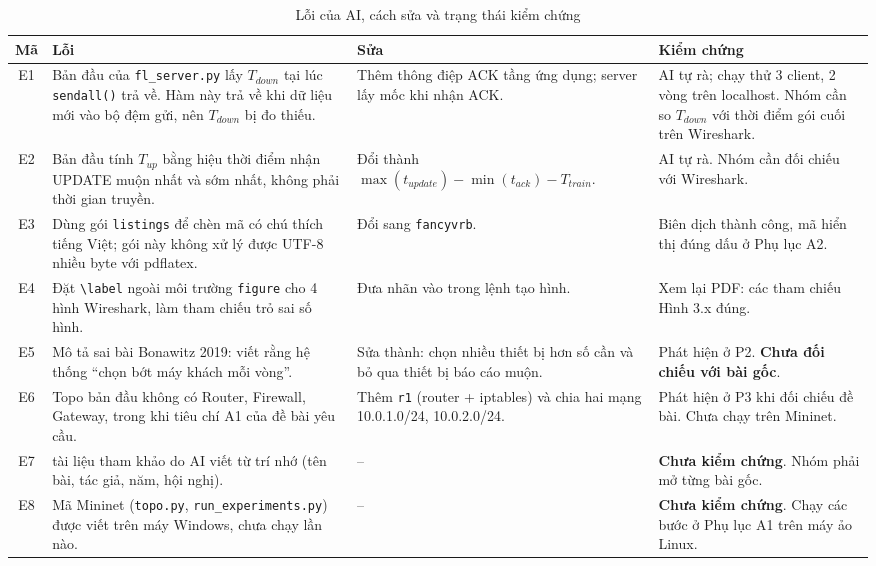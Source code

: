\begin{table}[H]
    \centering
    \caption{Lỗi của AI, cách sửa và trạng thái kiểm chứng}
    \label{tab:aierrors}
    \footnotesize
    \begin{tabularx}{\textwidth}{c >{\raggedright\arraybackslash}X >{\raggedright\arraybackslash}X >{\raggedright\arraybackslash}X}
        \toprule
        \textbf{Mã} & \textbf{Lỗi} & \textbf{Sửa} & \textbf{Kiểm chứng} \\
        \midrule
        E1 & Bản đầu của \texttt{fl\_server.py} lấy $T_{down}$ tại lúc \texttt{sendall()} trả về. Hàm này trả về khi dữ liệu mới vào bộ đệm gửi, nên $T_{down}$ bị đo thiếu. & Thêm thông điệp ACK tầng ứng dụng; server lấy mốc khi nhận ACK. & AI tự rà; chạy thử 3 client, 2 vòng trên localhost. Nhóm cần so $T_{down}$ với thời điểm gói cuối trên Wireshark. \\
        \midrule
        E2 & Bản đầu tính $T_{up}$ bằng hiệu thời điểm nhận UPDATE muộn nhất và sớm nhất, không phải thời gian truyền. & Đổi thành $\max(t_{update}) - \min(t_{ack}) - T_{train}$. & AI tự rà. Nhóm cần đối chiếu với Wireshark. \\
        \midrule
        E3 & Dùng gói \texttt{listings} để chèn mã có chú thích tiếng Việt; gói này không xử lý được UTF-8 nhiều byte với pdflatex. & Đổi sang \texttt{fancyvrb}. & Biên dịch thành công, mã hiển thị đúng dấu ở Phụ lục A2. \\
        \midrule
        E4 & Đặt \texttt{\textbackslash label} ngoài môi trường \texttt{figure} cho 4 hình Wireshark, làm tham chiếu trỏ sai số hình. & Đưa nhãn vào trong lệnh tạo hình. & Xem lại PDF: các tham chiếu Hình 3.x đúng. \\
        \midrule
        E5 & Mô tả sai bài Bonawitz 2019: viết rằng hệ thống ``chọn bớt máy khách mỗi vòng''. & Sửa thành: chọn nhiều thiết bị hơn số cần và bỏ qua thiết bị báo cáo muộn. & Phát hiện ở P2. \textbf{Chưa đối chiếu với bài gốc}. \\
        \midrule
        E6 & Topo bản đầu không có Router, Firewall, Gateway, trong khi tiêu chí A1 của đề bài yêu cầu. & Thêm \texttt{r1} (router + iptables) và chia hai mạng 10.0.1.0/24, 10.0.2.0/24. & Phát hiện ở P3 khi đối chiếu đề bài. Chưa chạy trên Mininet. \\
        \midrule
        E7 & 14 tài liệu tham khảo do AI viết từ trí nhớ (tên bài, tác giả, năm, hội nghị). & -- & \textbf{Chưa kiểm chứng}. Nhóm phải mở từng bài gốc. \\
        \midrule
        E8 & Mã Mininet (\texttt{topo.py}, \texttt{run\_experiments.py}) được viết trên máy Windows, chưa chạy lần nào. & -- & \textbf{Chưa kiểm chứng}. Chạy các bước ở Phụ lục A1 trên máy ảo Linux. \\
        \bottomrule
    \end{tabularx}
\end{table}


